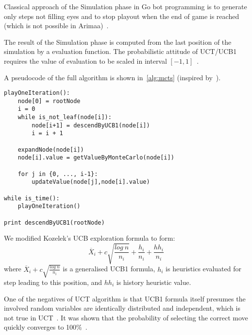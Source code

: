 Classical approach of the Simulation phase in Go bot programming is to generate
only steps not filling eyes and to stop playout when the end of game is
reached (which is not possible in Arimaa)~\cite{MoGo}.

The result of the Simulation phase is computed from the last position of the
simulation by a evaluation function. The probabilistic attitude of UCT/UCB1
requires the value of evaluation to be scaled in interval
$[-1,1]$~\cite{KOZELEK}.

A pseudocode of the full algorithm is shown in~\ref{alg:mcts} (inspired
by~\cite{MoGo}).

\lstset{language=Python, caption=Pseudocode of the MonteCarlo Tree Search, label=alg:mcts}
\begin{lstlisting}
playOneIteration():
    node[0] = rootNode
    i = 0
    while is_not_leaf(node[i]):
        node[i+1] = descendByUCB1(node[i])
        i = i + 1

    expandNode(node[i])
    node[i].value = getValueByMonteCarlo(node[i])

    for j in {0, ..., i-1}:
        updateValue(node[j],node[i].value)

while is_time():
    playOneIteration()

print descendByUCB1(rootNode)
\end{lstlisting}

We modified Kozelek's UCB exploration formula to form:
	$$
	\overline X_i + c \sqrt{\frac{log~n}{n_i}} + \frac{h_i}{n_i} + \frac{hh_i}{n_i}
	$$
where $\overline X_i + c \sqrt{\frac{log~n}{n_i}}$ is a generalised UCB1
formula, $h_i$ is heuristics evaluated for step leading to this position, and
$hh_i$ is history heuristic value.

One of the negatives of UCT algorithm is that UCB1 formula itself presumes the
involved random variables are identically distributed and independent, which is
not true in UCT~\cite{MoGo}. It was shown that the probability of selecting the
correct move quickly converges to 100\%~\cite{UCTanalysis}.

